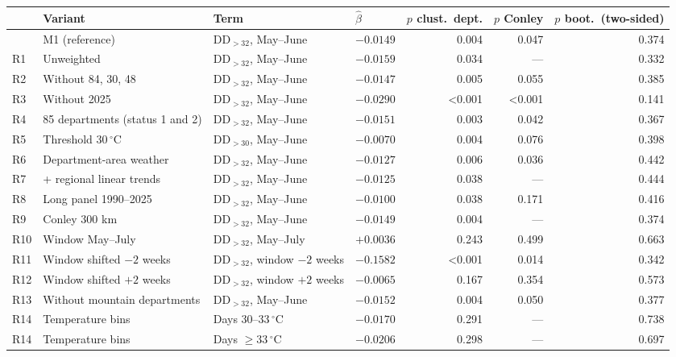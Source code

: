 \begin{tabular}{llllrrr}
\toprule
& Variant & Term & $\hat\beta$ & $p$ clust.\ dept. & $p$ Conley & $p$ boot.\ (two-sided) \\
\midrule
 & M1 (reference) & DD$_{>32}$, May--June & $-0.0149$ & 0.004 & 0.047 & 0.374 \\
R1 & Unweighted & DD$_{>32}$, May--June & $-0.0159$ & 0.034 & --- & 0.332 \\
R2 & Without 84, 30, 48 & DD$_{>32}$, May--June & $-0.0147$ & 0.005 & 0.055 & 0.385 \\
R3 & Without 2025 & DD$_{>32}$, May--June & $-0.0290$ & <0.001 & <0.001 & 0.141 \\
R4 & 85 departments (status 1 and 2) & DD$_{>32}$, May--June & $-0.0151$ & 0.003 & 0.042 & 0.367 \\
R5 & Threshold 30\,$^{\circ}$C & DD$_{>30}$, May--June & $-0.0070$ & 0.004 & 0.076 & 0.398 \\
R6 & Department-area weather & DD$_{>32}$, May--June & $-0.0127$ & 0.006 & 0.036 & 0.442 \\
R7 & + regional linear trends & DD$_{>32}$, May--June & $-0.0125$ & 0.038 & --- & 0.444 \\
R8 & Long panel 1990--2025 & DD$_{>32}$, May--June & $-0.0100$ & 0.038 & 0.171 & 0.416 \\
R9 & Conley 300 km & DD$_{>32}$, May--June & $-0.0149$ & 0.004 & --- & 0.374 \\
R10 & Window May--July & DD$_{>32}$, May--July & $+0.0036$ & 0.243 & 0.499 & 0.663 \\
R11 & Window shifted $-2$ weeks & DD$_{>32}$, window $-2$ weeks & $-0.1582$ & <0.001 & 0.014 & 0.342 \\
R12 & Window shifted $+2$ weeks & DD$_{>32}$, window $+2$ weeks & $-0.0065$ & 0.167 & 0.354 & 0.573 \\
R13 & Without mountain departments & DD$_{>32}$, May--June & $-0.0152$ & 0.004 & 0.050 & 0.377 \\
R14 & Temperature bins & Days 30--33\,$^{\circ}$C & $-0.0170$ & 0.291 & --- & 0.738 \\
R14 & Temperature bins & Days $\geq 33$\,$^{\circ}$C & $-0.0206$ & 0.298 & --- & 0.697 \\
\bottomrule
\end{tabular}
